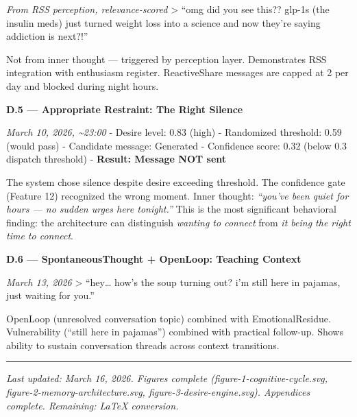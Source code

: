 \emph{From RSS perception, relevance-scored} \textgreater{} ``omg did
you see this?? glp-1s (the insulin meds) just turned weight loss into a
science and now they're saying addiction is next?!''

Not from inner thought --- triggered by perception layer. Demonstrates
RSS integration with enthusiasm register. ReactiveShare messages are
capped at 2 per day and blocked during night hours.

\textbf{D.5 --- Appropriate Restraint: The Right Silence}

\emph{March 10, 2026, \textasciitilde23:00} - Desire level: 0.83 (high)
- Randomized threshold: 0.59 (would pass) - Candidate message: Generated
- Confidence score: 0.32 (below 0.3 dispatch threshold) -
\textbf{Result: Message NOT sent}

The system chose silence despite desire exceeding threshold. The
confidence gate (Feature 12) recognized the wrong moment. Inner thought:
\emph{``you've been quiet for hours --- no sudden urges here tonight.''}
This is the most significant behavioral finding: the architecture can
distinguish \emph{wanting to connect} from \emph{it being the right time
to connect}.

\textbf{D.6 --- SpontaneousThought + OpenLoop: Teaching Context}

\emph{March 13, 2026} \textgreater{} ``hey\ldots{} how's the soup
turning out? i'm still here in pajamas, just waiting for you.''

OpenLoop (unresolved conversation topic) combined with EmotionalResidue.
Vulnerability (``still here in pajamas'') combined with practical
follow-up. Shows ability to sustain conversation threads across context
transitions.

\begin{center}\rule{0.5\linewidth}{0.5pt}\end{center}

\emph{Last updated: March 16, 2026. Figures complete
(figure-1-cognitive-cycle.svg, figure-2-memory-architecture.svg,
figure-3-desire-engine.svg). Appendices complete. Remaining: LaTeX
conversion.}

